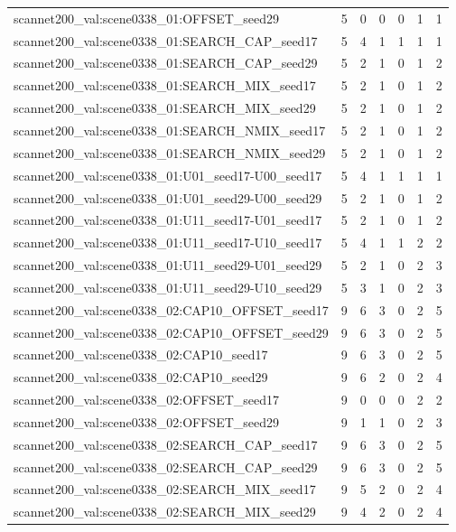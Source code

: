 \begin{table}[t]
\begin{tabular}{lrrrrrr}
scannet200\_val:scene0338\_01:OFFSET\_seed29 & 5 & 0 & 0 & 0 & 1 & 1 \\
scannet200\_val:scene0338\_01:SEARCH\_CAP\_seed17 & 5 & 4 & 1 & 1 & 1 & 1 \\
scannet200\_val:scene0338\_01:SEARCH\_CAP\_seed29 & 5 & 2 & 1 & 0 & 1 & 2 \\
scannet200\_val:scene0338\_01:SEARCH\_MIX\_seed17 & 5 & 2 & 1 & 0 & 1 & 2 \\
scannet200\_val:scene0338\_01:SEARCH\_MIX\_seed29 & 5 & 2 & 1 & 0 & 1 & 2 \\
scannet200\_val:scene0338\_01:SEARCH\_NMIX\_seed17 & 5 & 2 & 1 & 0 & 1 & 2 \\
scannet200\_val:scene0338\_01:SEARCH\_NMIX\_seed29 & 5 & 2 & 1 & 0 & 1 & 2 \\
scannet200\_val:scene0338\_01:U01\_seed17-U00\_seed17 & 5 & 4 & 1 & 1 & 1 & 1 \\
scannet200\_val:scene0338\_01:U01\_seed29-U00\_seed29 & 5 & 2 & 1 & 0 & 1 & 2 \\
scannet200\_val:scene0338\_01:U11\_seed17-U01\_seed17 & 5 & 2 & 1 & 0 & 1 & 2 \\
scannet200\_val:scene0338\_01:U11\_seed17-U10\_seed17 & 5 & 4 & 1 & 1 & 2 & 2 \\
scannet200\_val:scene0338\_01:U11\_seed29-U01\_seed29 & 5 & 2 & 1 & 0 & 2 & 3 \\
scannet200\_val:scene0338\_01:U11\_seed29-U10\_seed29 & 5 & 3 & 1 & 0 & 2 & 3 \\
scannet200\_val:scene0338\_02:CAP10\_OFFSET\_seed17 & 9 & 6 & 3 & 0 & 2 & 5 \\
scannet200\_val:scene0338\_02:CAP10\_OFFSET\_seed29 & 9 & 6 & 3 & 0 & 2 & 5 \\
scannet200\_val:scene0338\_02:CAP10\_seed17 & 9 & 6 & 3 & 0 & 2 & 5 \\
scannet200\_val:scene0338\_02:CAP10\_seed29 & 9 & 6 & 2 & 0 & 2 & 4 \\
scannet200\_val:scene0338\_02:OFFSET\_seed17 & 9 & 0 & 0 & 0 & 2 & 2 \\
scannet200\_val:scene0338\_02:OFFSET\_seed29 & 9 & 1 & 1 & 0 & 2 & 3 \\
scannet200\_val:scene0338\_02:SEARCH\_CAP\_seed17 & 9 & 6 & 3 & 0 & 2 & 5 \\
scannet200\_val:scene0338\_02:SEARCH\_CAP\_seed29 & 9 & 6 & 3 & 0 & 2 & 5 \\
scannet200\_val:scene0338\_02:SEARCH\_MIX\_seed17 & 9 & 5 & 2 & 0 & 2 & 4 \\
scannet200\_val:scene0338\_02:SEARCH\_MIX\_seed29 & 9 & 4 & 2 & 0 & 2 & 4 \\

\end{tabular}
\end{table}
